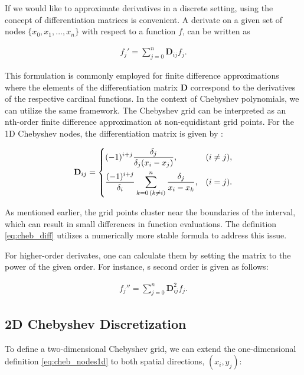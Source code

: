 If we would like to approximate derivatives in a discrete setting, using the
concept of differentiation matrices is convenient. A derivate on a given set of
nodes $\{x_0, x_1,..., x_n\}$ with respect to a function $f$, can be written as

\begin{align}
f_j' = \sum_{j=0}^{n}\mathbf{D}_{ij}f_j.
\end{align}

This formulation is commonly employed for finite difference approximations
where the elements of the differentiation matrix $\mathbf{D}$ correspond to the
derivatives of the respective cardinal functions. In the context of Chebyshev
polynomials, we can utilize the same framework. The Chebyshev grid can be
interpreted as an nth-order finite difference approximation at non-equidistant
grid points. For the 1D Chebyshev nodes, the differentiation matrix is given by
\citep{meseguer2020}:

\begin{align}
\mathbf{D}_{ij} =
\begin{dcases}
  (-1)^{i+j} \frac{\delta_j}{\delta_j(x_i - x_j)},
    & (i \neq j), \\
  \frac{(-1)^{i+j}}{\delta_i} \sum^{n}_{k=0 \, (k \neq i)}
    \frac{\delta_j}{x_i - x_k}, & (i = j).
\end{dcases}
\label{eq:cheb_diff}
\end{align}

As mentioned earlier, the grid points cluster near the boundaries of the
interval, which can result in small differences in function evaluations. The
definition \eqref{eq:cheb_diff} utilizes a numerically more stable formula to
address this issue.

For higher-order derivates, one can calculate them by setting the matrix to the
power of the given order. For instance, s second order is given as follows:

\begin{align}
  f_j'' = \sum_{j=0}^{n}\mathbf{D}_{ij}^{2}f_j.
\end{align}

\subsection{2D Chebyshev Discretization}

To define a two-dimensional Chebyshev grid, we can extend the one-dimensional
definition \eqref{eq:cheb_nodes1d} to both spatial directions, $(x_i, y_j)$:

